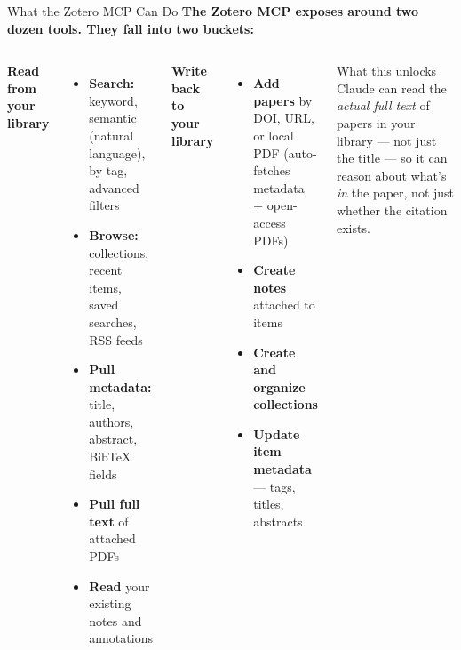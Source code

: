 \documentclass[aspectratio=169, 11pt]{beamer}
\begin{document}
\begin{frame}{What the Zotero MCP Can Do}
  \textbf{The Zotero MCP exposes around two dozen tools. They fall into two buckets:}

  \vspace{0.5em}
  \begin{columns}[T]
    \textbf{Read from your library}
    \begin{itemize}\small
      \item \textbf{Search:} keyword, semantic (natural language), by tag, advanced filters
      \item \textbf{Browse:} collections, recent items, saved searches, RSS feeds
      \item \textbf{Pull metadata:} title, authors, abstract, BibTeX fields
      \item \textbf{Pull full text} of attached PDFs
      \item \textbf{Read} your existing notes and annotations
    \end{itemize}

    \textbf{Write back to your library}
    \begin{itemize}\small
      \item \textbf{Add papers} by DOI, URL, or local PDF (auto-fetches metadata + open-access PDFs)
      \item \textbf{Create notes} attached to items
      \item \textbf{Create and organize collections}
      \item \textbf{Update item metadata} --- tags, titles, abstracts
    \end{itemize}

    \vspace{0.6em}
    \begin{block}{\small What this unlocks}
      \small Claude can read the \emph{actual full text} of papers in your library --- not just the title --- so it can reason about what's \emph{in} the paper, not just whether the citation exists.
    \end{block}
  \end{columns}
\end{frame}
\end{document}
